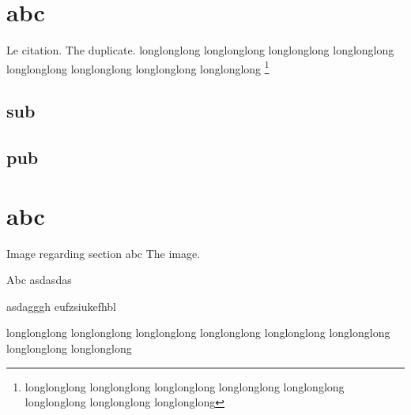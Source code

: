 \documentclass[first=firstname,last=lastname,company=comp,location=Dresden]{baarticle}
\begin{document}
    \section{abc}
    Le citation.
    The duplicate.
    longlonglong longlonglong longlonglong longlonglong longlonglong longlonglong longlonglong longlonglong
    \footnote{longlonglong longlonglong longlonglong longlonglong longlonglong longlonglong longlonglong longlonglong}
    \subsection{sub}
    \subsection{pub}
    \section{abc}
    \begin{bafigure}{Image regarding section abc}
        The image.
    \end{bafigure}
    \clearpage
    \begin{baappx}
        \begin{bafigure}{Abc}
            asdasdas
        \end{bafigure}
    asdagggh
    eufzsiukefhbl
    \end{baappx}
    \clearpage
    \printbibliography[heading=bibintoc]
    longlonglong longlonglong longlonglong longlonglong longlonglong longlonglong longlonglong longlonglong
    \clearpage
\end{document}

